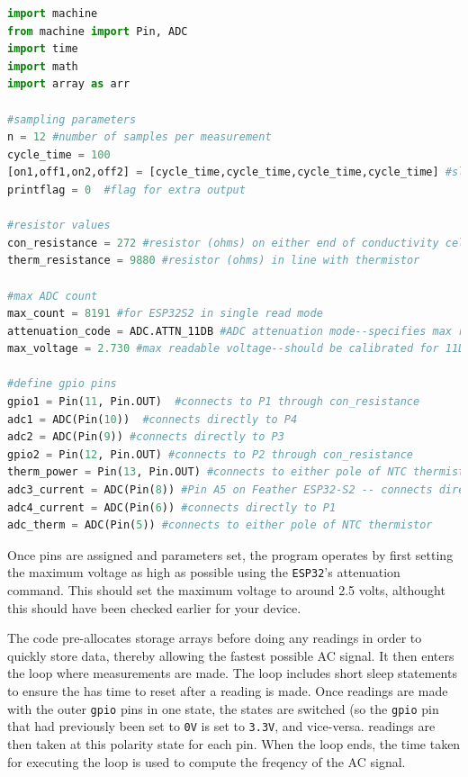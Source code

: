 \begin{lstlisting}[language=Python]
import machine
from machine import Pin, ADC
import time
import math
import array as arr

#sampling parameters
n = 12 #number of samples per measurement
cycle_time = 100
[on1,off1,on2,off2] = [cycle_time,cycle_time,cycle_time,cycle_time] #sleep time in microseconds
printflag = 0  #flag for extra output

#resistor values 
con_resistance = 272 #resistor (ohms) on either end of conductivity cell
therm_resistance = 9880 #resistor (ohms) in line with thermistor

#max ADC count
max_count = 8191 #for ESP32S2 in single read mode
attenuation_code = ADC.ATTN_11DB #ADC attenuation mode--specifies max readable voltage
max_voltage = 2.730 #max readable voltage--should be calibrated for 11DB atten

#define gpio pins
gpio1 = Pin(11, Pin.OUT)  #connects to P1 through con_resistance
adc1 = ADC(Pin(10))  #connects directly to P4
adc2 = ADC(Pin(9)) #connects directly to P3
gpio2 = Pin(12, Pin.OUT) #connects to P2 through con_resistance
therm_power = Pin(13, Pin.OUT) #connects to either pole of NTC thermistor
adc3_current = ADC(Pin(8)) #Pin A5 on Feather ESP32-S2 -- connects directly to P2
adc4_current = ADC(Pin(6)) #connects directly to P1
adc_therm = ADC(Pin(5)) #connects to either pole of NTC thermistor

\end{lstlisting}

Once pins are assigned and parameters set, the program operates by first setting the maximum \adc voltage as high as possible using the \texttt{ESP32}'s attenuation command.  This should set the maximum voltage to around 2.5 volts, althought this should have been checked earlier for your device.

The code pre-allocates storage arrays before doing any readings in order to quickly store data, thereby allowing the fastest possible AC signal. It then enters the loop where \adc measurements are made. The loop includes short sleep statements to ensure the \adc has time to reset after a reading is made. Once readings are made with the outer \texttt{gpio} pins in one state, the states are switched (so the \texttt{gpio} pin that had previously been set to \texttt{0V} is set to \texttt{3.3V}, and vice-versa. \adc readings are then taken at this polarity state for each \adc pin. When the loop ends, the time taken for executing the loop is used to compute the freqency of the AC signal.

